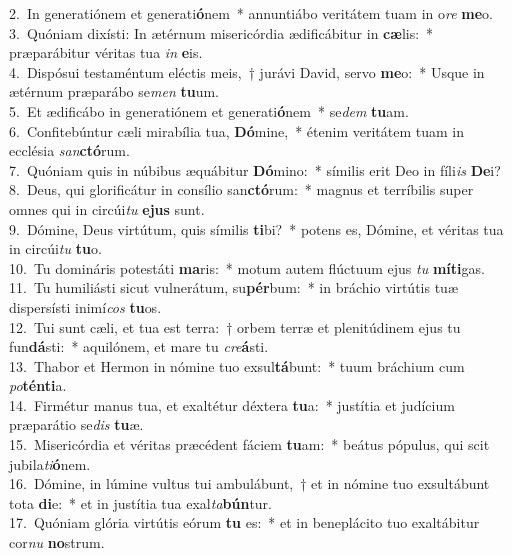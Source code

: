 {2.~}In generatiónem et generati\textbf{ó}nem~* annuntiábo veritátem tuam in o\textit{re} \textbf{me}o.\\
{3.~}Quóniam dixísti: In ætérnum misericórdia ædificábitur in \textbf{cæ}lis:~* præparábitur véritas tua \textit{in} \textbf{e}is.\\
{4.~}Dispósui testaméntum eléctis meis,~† jurávi David, servo \textbf{me}o:~* Usque in ætérnum præparábo se\textit{men} \textbf{tu}um.\\
{5.~}Et ædificábo in generatiónem et generati\textbf{ó}nem~* se\textit{dem} \textbf{tu}am.\\
{6.~}Confitebúntur cæli mirabília tua, \textbf{Dó}mine,~* étenim veritátem tuam in ecclésia \textit{san}\textbf{ctó}rum.\\
{7.~}Quóniam quis in núbibus æquábitur \textbf{Dó}mino:~* símilis erit Deo in fíli\textit{is} \textbf{De}i?\\
{8.~}Deus, qui glorificátur in consílio san\textbf{ctó}rum:~* magnus et terríbilis super omnes qui in circúi\textit{tu} \textbf{e}\textbf{jus} sunt.\\
{9.~}Dómine, Deus virtútum, quis símilis \textbf{ti}bi?~* potens es, Dómine, et véritas tua in circúi\textit{tu} \textbf{tu}o.\\
{10.~}Tu domináris potestáti \textbf{ma}ris:~* motum autem flúctuum ejus \textit{tu} \textbf{mí}\textbf{ti}gas.\\
{11.~}Tu humiliásti sicut vulnerátum, su\textbf{pér}bum:~* in bráchio virtútis tuæ dispersísti inimí\textit{cos} \textbf{tu}os.\\
{12.~}Tui sunt cæli, et tua est terra:~† orbem terræ et plenitúdinem ejus tu fun\textbf{dá}sti:~* aquilónem, et mare tu \textit{cre}\textbf{á}sti.\\
{13.~}Thabor et Hermon in nómine tuo exsul\textbf{tá}bunt:~* tuum bráchium cum \textit{po}\textbf{tén}\textbf{ti}a.\\
{14.~}Firmétur manus tua, et exaltétur déxtera \textbf{tu}a:~* justítia et judícium præparátio se\textit{dis} \textbf{tu}æ.\\
{15.~}Misericórdia et véritas præcédent fáciem \textbf{tu}am:~* beátus pópulus, qui scit jubila\textit{ti}\textbf{ó}nem.\\
{16.~}Dómine, in lúmine vultus tui ambulábunt,~† et in nómine tuo exsultábunt tota \textbf{di}e:~* et in justítia tua exal\textit{ta}\textbf{bún}tur.\\
{17.~}Quóniam glória virtútis eórum \textbf{tu} es:~* et in beneplácito tuo exaltábitur cor\textit{nu} \textbf{no}strum.\\
